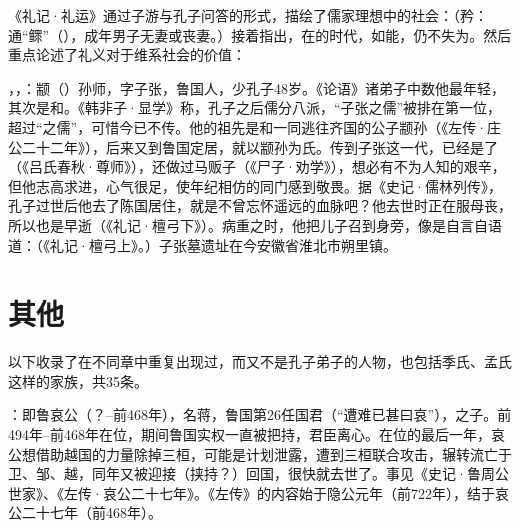 《礼记·礼运》通过子游与孔子问答的形式，描绘了儒家理想中的社会：（矜：通“鳏”（），成年男子无妻或丧妻。）接着指出，在的时代，如能，仍不失为。然后重点论述了礼义对于维系社会的价值：

，，：颛（）孙师，字子张，鲁国人，少孔子48岁。《论语》诸弟子中数他最年轻，其次是和。《韩非子·显学》称，孔子之后儒分八派，“子张之儒”被排在第一位，超过“之儒”，可惜今已不传。他的祖先是和一同逃往齐国的公子颛孙（《左传·庄公二十二年》），后来又到鲁国定居，就以颛孙为氏。传到子张这一代，已经是了（《吕氏春秋·尊师》），还做过马贩子（《尸子·劝学》），想必有不为人知的艰辛，但他志高求进，心气很足，使年纪相仿的同门感到敬畏。据《史记·儒林列传》，孔子过世后他去了陈国居住，就是不曾忘怀遥远的血脉吧？他去世时正在服母丧，所以也是早逝（《礼记·檀弓下》）。病重之时，他把儿子召到身旁，像是自言自语道：（《礼记·檀弓上》。）子张墓遗址在今安徽省淮北市朔里镇。


\lypdfbookmark\section*{其他}

以下收录了在不同章中重复出现过，而又不是孔子弟子的人物，也包括季氏、孟氏这样的家族，共35条。

\bigskip

：即鲁哀公（？--前468年），名蒋，鲁国第26任国君（“遭难已甚曰哀”），之子。前494年--前468年在位，期间鲁国实权一直被把持，君臣离心。在位的最后一年，哀公想借助越国的力量除掉三桓，可能是计划泄露，遭到三桓联合攻击，辗转流亡于卫、邹、越，同年又被迎接（挟持？）回国，很快就去世了。事见《史记·鲁周公世家》、《左传·哀公二十七年》。《左传》的内容始于隐公元年（前722年），结于哀公二十七年（前468年）。%

